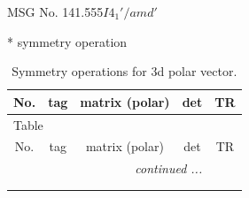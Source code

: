 \documentclass[fleqn,8pt]{jsarticle}
\begin{document}
\setcounter{MaxMatrixCols}{32}

\renewcommand{\tablename}{Table~}
\renewcommand{\figurename}{Figure~}
\begin{center}
\LARGE
MSG No. 141.555\quad$I4_{1}'/amd'$
\end{center}
* symmetry operation
\renewcommand{\arraystretch}{1.3}
\begin{longtable}{ccccc}
\caption{Symmetry operations for 3d polar vector.}
 \\
 \hline \hline
No. & tag & matrix (polar) & det & TR \\ \hline \endfirsthead

\multicolumn{4}{l}{\tablename\ \thetable{}} \\
 \hline \hline
No. & tag & matrix (polar) & det & TR \\ \hline \endhead

 \hline \hline
\multicolumn{4}{r}{\footnotesize\it continued ...} \\ \endfoot

 \hline \hline
\multicolumn{4}{r}{} \\ \endlastfoot


\end{longtable}
\end{document}
